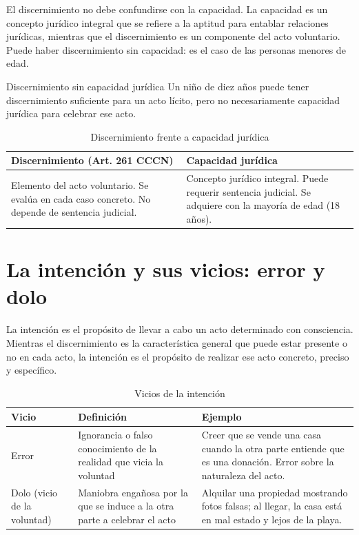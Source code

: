\documentclass[12pt,oneside]{book}
\begin{document}
\begin{important}
El discernimiento no debe confundirse con la capacidad. La capacidad es un concepto jurídico integral que se refiere a la aptitud para entablar relaciones jurídicas, mientras que el discernimiento es un componente del acto voluntario. Puede haber discernimiento sin capacidad: es el caso de las personas menores de edad.
\end{important}

\begin{example}{Discernimiento sin capacidad jurídica}
Un niño de diez años puede tener discernimiento suficiente para un acto lícito, pero no necesariamente capacidad jurídica para celebrar ese acto.
\end{example}

\begin{table}[H]
\centering
\caption{Discernimiento frente a capacidad jurídica}
\begin{tabularx}{\textwidth}{X X}
\toprule
\textbf{Discernimiento (Art. 261 CCCN)} & \textbf{Capacidad jurídica} \\
\midrule
Elemento del acto voluntario. Se evalúa en cada caso concreto. No depende de sentencia judicial. & Concepto jurídico integral. Puede requerir sentencia judicial. Se adquiere con la mayoría de edad (18 años). \\
\bottomrule
\end{tabularx}
\end{table}

\section{La intención y sus vicios: error y dolo}

La intención es el propósito de llevar a cabo un acto determinado con consciencia. Mientras el discernimiento es la característica general que puede estar presente o no en cada acto, la intención es el propósito de realizar ese acto concreto, preciso y específico.

\begin{table}[H]
\centering
\caption{Vicios de la intención}
\begin{tabularx}{\textwidth}{l X X}
\toprule
\textbf{Vicio} & \textbf{Definición} & \textbf{Ejemplo} \\
\midrule
Error & Ignorancia o falso conocimiento de la realidad que vicia la voluntad & Creer que se vende una casa cuando la otra parte entiende que es una donación. Error sobre la naturaleza del acto. \\
Dolo (vicio de la voluntad) & Maniobra engañosa por la que se induce a la otra parte a celebrar el acto & Alquilar una propiedad mostrando fotos falsas; al llegar, la casa está en mal estado y lejos de la playa. \\
\bottomrule
\end{tabularx}
\end{table}
\end{document}
